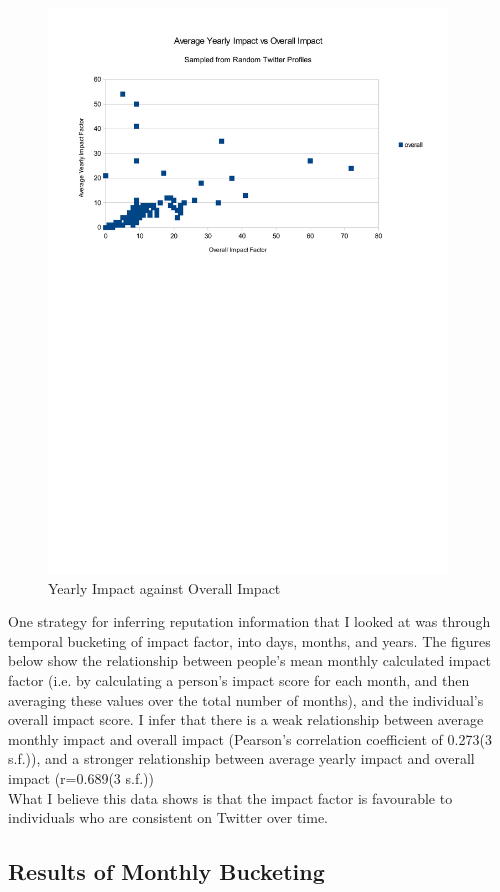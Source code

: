\begin{figure}[h!]
\centering
\includegraphics[width=400px]{Images/yearly_impact_vs_overallv2.pdf}
\caption{Yearly Impact against Overall Impact}
\end{figure}

One strategy for inferring reputation information that I looked at was through temporal bucketing of impact factor, into days, months, and years. The figures below show the relationship between people's mean monthly calculated impact factor (i.e. by calculating a person's impact score for each month, and then averaging these values over the total number of months), and the individual's overall impact score. I infer that there is a weak relationship between average monthly impact and overall impact (Pearson's correlation coefficient of 0.273(3 s.f.)), and a stronger relationship between average yearly impact and overall impact (r=0.689(3 s.f.))\\

\noindent What I believe this data shows is that the impact factor is favourable to individuals who are consistent on Twitter over time. 

\subsection{Results of Monthly Bucketing}

